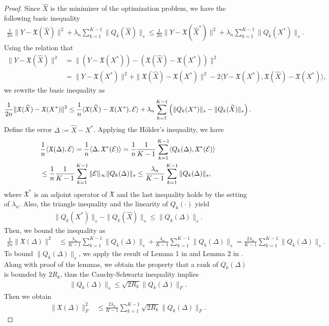 \begin{proof}

Since $\hat{X}$ is the minimizer of the optimization problem, we have the following basic inequality
\begin{align*}
	\frac{1}{2n}\|Y - \mathfrak{X}(\hat{X})\|^2 + \lambda_n \sum_{k=1}^{K-1} \|Q_k(\hat{X})\|_{s} \leq \frac{1}{2n}\|Y - \mathfrak{X}(\hat{X}^*)\|^2 + \lambda_n  \sum_{k=1}^{K-1} \|Q_k(X^*)\|_{s}.
\end{align*}
Using the relation that
\begin{align*}
	\|Y - \mathfrak{X}(\hat{X})\|^2& = \|(Y - \mathfrak{X}(X^*)) -( \mathfrak{X}(\hat{X}) - \mathfrak{X}(X^*))\|^2 \\
	&= \|Y - \mathfrak{X}(X^*)\|^2 + \| \mathfrak{X}(\hat{X}) - \mathfrak{X}(X^*)\|^2 - 2\langle Y - \mathfrak{X}(X^*), \mathfrak{X}(\hat{X}) - \mathfrak{X}(X^*)\rangle,
\end{align*}
we rewrite the basic inequality as
\begin{align*}
	\frac{1}{2n}\| \mathfrak{X}(\widehat{X}) - \mathfrak{X}(X^*)\|^2 \leq \frac{1}{n} \langle \mathfrak{X}(\widehat{X}) - \mathfrak{X}(X^*), \mathcal{E} \rangle + \lambda_n \sum_{k=1}^{K-1} \left( \|Q_k(X^*)\|_s - \|Q_k(\widehat{X})\|_s \right).
\end{align*}
Define the error $\Delta := \hat{X} - X^*$.
Applying the H\"older's inequality, we have
\begin{align*}
	&\frac{1}{n}\langle \mathfrak{X}(\Delta) , \mathcal{E} \rangle = \frac{1}{n} \langle \Delta , \mathfrak{X}^*(\mathcal{E}) \rangle = \frac{1}{n}\frac{1}{K-1}\sum_{k=1}^{K-1} \langle Q_k(\Delta), \mathfrak{X}^*(\mathcal{E}) \rangle \\
	&\leq \frac{1}{n} \frac{1}{K-1}\sum_{k=1}^{K-1} \|\mathcal{E}\|_{\infty} \|Q_k(\Delta)\|_{s} \leq \frac{\lambda_n }{K-1} \sum_{k=1}^{K-1}\|Q_k(\Delta)\|_{s} ,
\end{align*}
where $\mathfrak{X}^*$ is an adjoint operator of $\mathfrak{X}$ and the last inequality holds by the setting of $\lambda_n$.
Also, the triangle inequality and the linearity of $Q_k(\cdot)$ yield
\begin{align*}
	\|Q_k(X^*)\|_s - \|Q_k(\hat{X})\|_s \leq \|Q_k(\Delta)\|_s.
\end{align*}
Then, we bound the inequality as
\begin{align*}
	\frac{1}{2n}\|\mathfrak{X}(\Delta)\|^2 &\leq \frac{\lambda_n }{K-1} \sum_{k=1}^{K-1}\|Q_k(\Delta)\|_{s} + \frac{ \lambda_n}{K-1} \sum_{k=1}^{K-1}\|Q_k(\Delta)\|_s =  \frac{2\lambda_n}{K-1}\sum_{k=1}^{K-1}\|Q_k(\Delta)\|_{s} .
\end{align*}
To bound $\|Q_k(\Delta)\|_{s}$,  we apply the result of Lemma 1 in \cite{negahban2011estimation} and Lemma 2 in \cite{tomioka2011statistical}.
Along with proof of the lemmas, we obtain the property that a rank of $Q_k(\Delta)$ is bounded by $2R_k$, thus the Cauchy-Schwartz inequality implies
\begin{align*}
	\|Q_k(\Delta)\|_s \leq  \sqrt{2R_k }\|Q_k(\Delta)\|_F.
\end{align*}
Then we obtain
\begin{align*}
	\|\mathfrak{X}(\Delta)\|_F^2 &\leq  \frac{2 \lambda_n}{K-1}\sum_{k=1}^{K-1} \sqrt{2R_k }\|Q_k(\Delta)\|_F.
\end{align*}


\end{proof}
